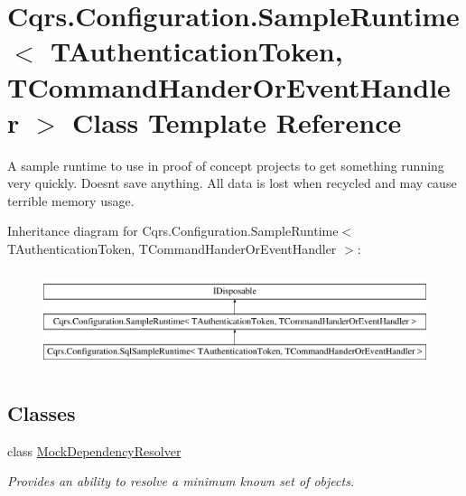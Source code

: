 \hypertarget{classCqrs_1_1Configuration_1_1SampleRuntime}{}\section{Cqrs.\+Configuration.\+Sample\+Runtime$<$ T\+Authentication\+Token, T\+Command\+Hander\+Or\+Event\+Handler $>$ Class Template Reference}
\label{classCqrs_1_1Configuration_1_1SampleRuntime}


A sample runtime to use in proof of concept projects to get something running very quickly. Doesn\textquotesingle{}t save anything. All data is lost when recycled and may cause terrible memory usage.  


Inheritance diagram for Cqrs.\+Configuration.\+Sample\+Runtime$<$ T\+Authentication\+Token, T\+Command\+Hander\+Or\+Event\+Handler $>$\+:\begin{figure}[H]
\begin{center}
\leavevmode
\includegraphics[height=2.886598cm]{classCqrs_1_1Configuration_1_1SampleRuntime}
\end{center}
\end{figure}
\subsection*{Classes}
\begin{DoxyCompactItemize}
\item 
class \hyperlink{classCqrs_1_1Configuration_1_1SampleRuntime_1_1MockDependencyResolver}{Mock\+Dependency\+Resolver}
\begin{DoxyCompactList}\small\item\em Provides an ability to resolve a minimum known set of objects. \end{DoxyCompactList}\end{DoxyCompactItemize}
